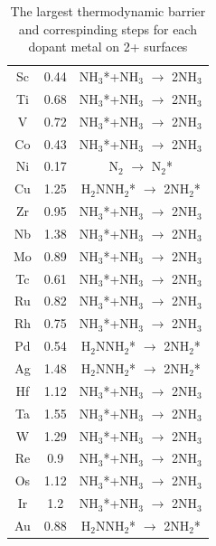 \begin{table}
\begin{center}
\begin{tabular}{| c | c |c |}
\hline
Sc & 0.44 & NH$_3$*+NH$_3$ $\rightarrow$ 2NH$_3$\\
Ti & 0.68 & NH$_3$*+NH$_3$ $\rightarrow$ 2NH$_3$\\
V & 0.72 & NH$_3$*+NH$_3$ $\rightarrow$ 2NH$_3$\\
Co & 0.43 & NH$_3$*+NH$_3$ $\rightarrow$ 2NH$_3$\\
Ni & 0.17 & N$_2$ $\rightarrow$ N$_2$*\\
Cu & 1.25 & H$_2$NNH$_2$* $\rightarrow$ 2NH$_2$*\\
Zr & 0.95 & NH$_3$*+NH$_3$ $\rightarrow$ 2NH$_3$\\
Nb & 1.38 & NH$_3$*+NH$_3$ $\rightarrow$ 2NH$_3$\\
Mo & 0.89 & NH$_3$*+NH$_3$ $\rightarrow$ 2NH$_3$\\
Tc & 0.61 & NH$_3$*+NH$_3$ $\rightarrow$ 2NH$_3$\\
Ru & 0.82 & NH$_3$*+NH$_3$ $\rightarrow$ 2NH$_3$\\
Rh & 0.75 & NH$_3$*+NH$_3$ $\rightarrow$ 2NH$_3$\\
Pd & 0.54 & H$_2$NNH$_2$* $\rightarrow$ 2NH$_2$*\\
Ag & 1.48 & H$_2$NNH$_2$* $\rightarrow$ 2NH$_2$*\\
Hf & 1.12 & NH$_3$*+NH$_3$ $\rightarrow$ 2NH$_3$\\
Ta & 1.55 & NH$_3$*+NH$_3$ $\rightarrow$ 2NH$_3$\\
W & 1.29 & NH$_3$*+NH$_3$ $\rightarrow$ 2NH$_3$\\
Re & 0.9 & NH$_3$*+NH$_3$ $\rightarrow$ 2NH$_3$\\
Os & 1.12 & NH$_3$*+NH$_3$ $\rightarrow$ 2NH$_3$\\
Ir & 1.2 & NH$_3$*+NH$_3$ $\rightarrow$ 2NH$_3$\\
Au & 0.88 & H$_2$NNH$_2$* $\rightarrow$ 2NH$_2$*\\
\hline
\end{tabular}
\end{center}
\caption{The largest thermodynamic barrier and correspinding steps for each dopant metal on 2+ surfaces}\label{table:limiting_steps}\end{table}\begin{figure}
\centering

\end{figure}
